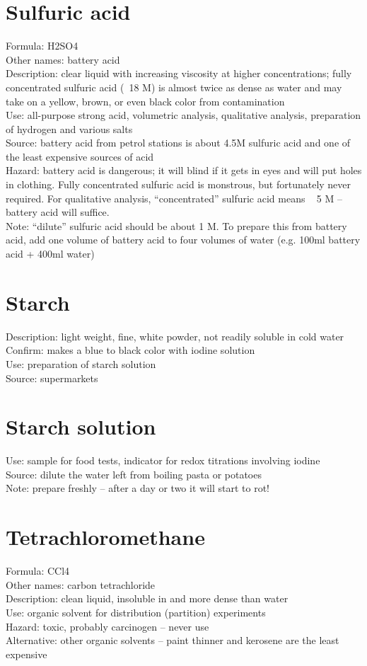 \section{Sulfuric acid}
Formula: H2SO4\\
Other names: battery acid\\
Description: clear liquid with increasing viscosity at higher concentrations; 
fully concentrated sulfuric acid (~18 M) is almost twice as dense as water 
and may take on a yellow, 
brown, 
or even black color from contamination\\
Use: all-purpose strong acid, 
volumetric analysis, 
qualitative analysis, 
preparation of hydrogen and various salts\\
Source: battery acid from petrol stations 
is about 4.5M sulfuric acid and one of the least expensive sources of acid\\
Hazard: battery acid is dangerous; 
it will blind if it gets in eyes and will put holes in clothing. 
Fully concentrated sulfuric acid is monstrous, 
but fortunately never required. 
For qualitative analysis, 
“concentrated” sulfuric acid means ~ 5 M – battery acid will suffice.\\
Note: “dilute” sulfuric acid should be about 1 M. 
To prepare this from battery acid, 
add one volume of battery acid to four volumes of water (e.g. 
100ml battery acid + 400ml water)

\section{Starch}
Description: light weight, 
fine, 
white powder, 
not readily soluble in cold water\\
Confirm: makes a blue to black color with iodine solution\\
Use: preparation of starch solution\\
Source: supermarkets

\section{Starch solution}
Use: sample for food tests, 
indicator for redox titrations involving iodine\\
Source: dilute the water left from boiling pasta or potatoes\\
Note: prepare freshly – after a day or two it will start to rot!

\section{Tetrachloromethane}
Formula: CCl4\\
Other names: carbon tetrachloride\\
Description: clean liquid, 
insoluble in and more dense than water\\
Use: organic solvent for distribution (partition) experiments\\
Hazard: toxic, 
probably carcinogen – never use\\
Alternative: other organic solvents – 
paint thinner and kerosene are the least expensive

